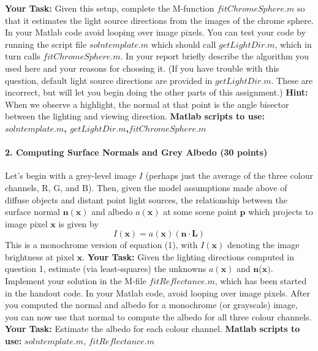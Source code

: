 \documentclass{paper}
\begin{document}
\textbf{Your Task: }Given this setup, complete the M-function $fitChromeSphere.m$ so that it estimates the light source directions from the images of the chrome sphere. In your Matlab code avoid looping over image pixels. You can test your code by running the script file $solntemplate.m$ which should call $getLightDir.m$, which in turn calls $fitChromeSphere.m$. In your report briefly describe the algorithm you used here and your reasons for choosing it. (If you have trouble with this question, default light source directions are provided in $getLightDir.m$. These are incorrect, but will let you begin doing the other parts of this assignment.)\newline
\textbf{Hint:} When we observe a highlight, the normal at that point is the angle bisector between the lighting and viewing direction.\newline 
\textbf{Matlab scripts to use: $solntemplate.m$, $getLightDir.m$,\newline $fitChromeSphere.m$} 

\paragraph{2. Computing Surface Normals and Grey Albedo (30 points)}
Let's begin with a grey-level image $I$ (perhaps just the average of the three colour channels, R, G, and B). Then, given the model assumptions made above of diffuse objects and distant point light sources, the relationship between the surface normal $\mathbf{n}(\mathbf{x})$ and albedo $a(\mathbf{x})$ at some scene point $\mathbf{p}$ which projects to image pixel $\mathbf{x}$ is given by
\begin{equation}
I(\mathbf{x})=a(\mathbf{x})(\mathbf{n}\cdot\mathbf{L})
\end{equation}
This is a monochrome version of equation (1), with $I(\textbf{x})$ denoting the image brightness at pixel $\mathbf{x}$.\newline
\textbf{Your Task: }Given the lighting directions computed in question 1, estimate (via least-squares) the unknowns $a(\mathbf{x})$ and $\mathbf{n}$($\mathbf{x})$. 
Implement your solution in the M-file $fitReflectance.m$, which has been started in the handout code. In your Matlab code, avoid looping over image pixels. After you computed the normal and albedo for a monochrome (or grayscale) image, you can now use that normal to compute the albedo for all three colour channels.\newline
\textbf{Your Task:} Estimate the albedo for each colour channel.\newline
\textbf{Matlab scripts to use:} $solntemplate.m$, $fitReflectance.m$
\end{document}
